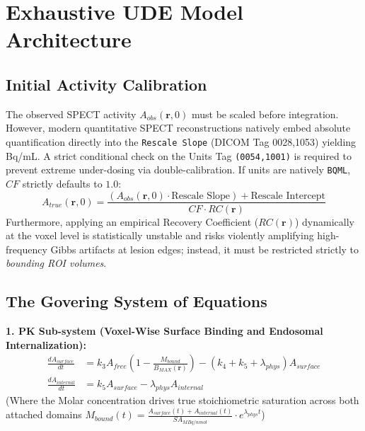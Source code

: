 \documentclass[11pt,a4paper]{article}
\begin{document}
\section{Exhaustive UDE Model Architecture}

\subsection{Initial Activity Calibration}
The observed SPECT activity $A_{obs}(\mathbf{r}, 0)$ must be scaled before integration. However, modern quantitative SPECT reconstructions natively embed absolute quantification directly into the \texttt{Rescale Slope} (DICOM Tag 0028,1053) yielding Bq/mL. A strict conditional check on the Units Tag \texttt{(0054,1001)} is required to prevent extreme under-dosing via double-calibration. If units are natively \texttt{BQML}, $CF$ strictly defaults to $1.0$:
\begin{equation}
    A_{true}(\mathbf{r}, 0) = \frac{\left( A_{obs}(\mathbf{r}, 0) \cdot \text{Rescale Slope} \right) + \text{Rescale Intercept}}{CF \cdot RC(\mathbf{r})}
\end{equation}
Furthermore, applying an empirical Recovery Coefficient ($RC(\mathbf{r})$) dynamically at the voxel level is statistically unstable and risks violently amplifying high-frequency Gibbs artifacts at lesion edges; instead, it must be restricted strictly to \textit{bounding ROI volumes}.

\subsection{The Govering System of Equations}
\textbf{1. PK Sub-system (Voxel-Wise Surface Binding and Endosomal Internalization):}
\begin{align}
    \frac{dA_{surface}}{dt} &= k_3 A_{free} \left( 1 - \frac{M_{bound}}{B_{MAX}(\mathbf{r})} \right) - (k_4 + k_5 + \lambda_{phys}) A_{surface} \\
    \frac{dA_{internal}}{dt} &= k_5 A_{surface} - \lambda_{phys} A_{internal}
\end{align}
(Where the Molar concentration drives true stoichiometric saturation across both attached domains $M_{bound}(t) = \frac{A_{surface}(t) + A_{internal}(t)}{SA_{MBq/nmol}} \cdot e^{\lambda_{phys} t}$)
\end{document}
